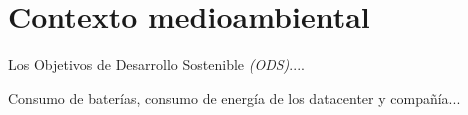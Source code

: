     
    

\section{Contexto medioambiental}

Los Objetivos de Desarrollo Sostenible \textit{(ODS)}....

Consumo de baterías, consumo de energía de los datacenter y compañía...